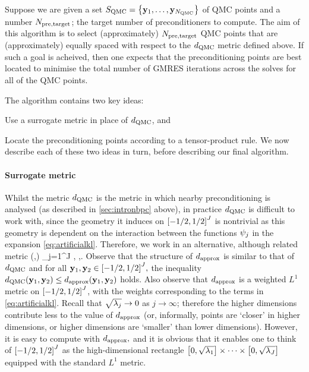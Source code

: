 Suppose we are given a set $\SQMC = \set{\byo,\ldots,\byNQMC}$ of QMC points and a number $N_{\mathrm{pre,target}}$; the target number of preconditioners to compute. The aim of this algorithm is to select (approximately) $N_{\mathrm{pre,target}}$ QMC points that are (approximately) equally spaced with respect to the $d_{\mathrm{QMC}}$ metric defined above. If such a goal is acheived, then one expects that the preconditioning points are best located to minimise the total number of GMRES iterations across the solves for all of the QMC points.

The algorithm contains two key ideas:
\ben
  \item Use a surrogate metric in place of $d_{\mathrm{QMC}}$, and
\item Locate the preconditioning points according to a tensor-product rule.
  \een
  We now describe each of these two ideas in turn, before describing our final algorithm.

\paragraph{Surrogate metric} Whilst the metric $d_{\mathrm{QMC}}$ is the metric in which  nearby preconditioning is analysed (as described in \cref{sec:intronbpc} above), in practice $d_{\mathrm{QMC}}$ is difficult to work with, since the  geometry it induces on $\cube{J}$ is nontrivial as this geometry is dependent on the interaction between the functions $\psi_{j}$ in the expansion \cref{eq:artificialkl}. Therefore, we work in an alternative, although related metric
  \beq\label{eq:dapprox}
\dapprox(\byo,\byt) \de \sum_{j=1}^{J} \sqrt{\lambdaj} , \tfor \byo,\by \in {}.
\eeq
Observe that the structure of $d_{\mathrm{approx}}$ is similar to that of $d_{\mathrm{QMC}}$ and for all $\byo,\byt \in \cube{J},$ the inequality $\dQMC\mleft(\byo,\byt\mright) \leq \dapprox\mleft(\byo,\byt\mright)$ holds. Also observe that $d_{\mathrm{approx}}$ is a weighted $L^1$ metric on $\cube{J}$, with the weights corresponding to the terms in \cref{eq:artificialkl}. Recall that $\sqrt{\lambda_{j}} \rightarrow 0$ as $j \rightarrow \infty$; therefore the higher dimensions contribute less to the value of $d_{\mathrm{approx}}$ (or, informally, points are `closer' in higher dimensions, or higher dimensions are `smaller' than lower dimensions). However, it is easy to compute with $d_{\mathrm{approx}},$ and it is obvious that it enables one to think of $\cube{J}$ as the high-dimensional rectangle $\mleft[0,\sqrt{\lambdao}\mright]\times\cdots\times\mleft[0,\sqrt{\lambdaJ}\mright]$ equipped with the standard $L^1$ metric.


